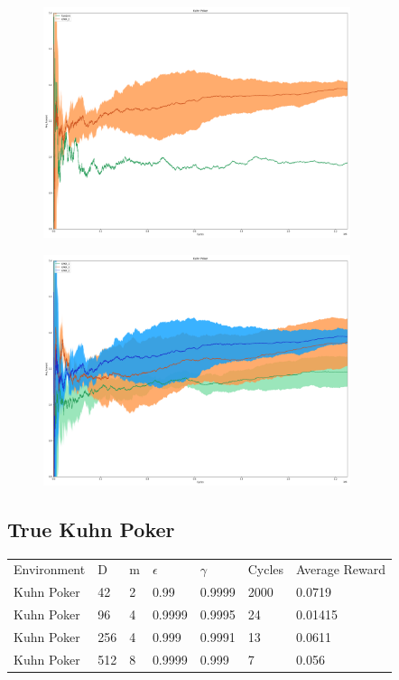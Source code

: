 \documentclass{article}
\theoremstyle{definition}
\newtheorem{primary statistics}[definition]{Primary Statistics}
\newtheorem{auxiliary statistics}[definition]{Auxiliary Statistics}
\begin{document}
 \begin{figure}[h]
 \centering
    \includegraphics[width=9cm]{RvU_Kuhn_Poker}
\end{figure}

 \begin{figure}[h]
 \centering
    \includegraphics[width=9cm]{BT_Kuhn_Poker_2}
\end{figure}

\newpage

\subsection{True Kuhn Poker}
\begin{tabular}{lllllll}
\centering
Environment & D & m & $\epsilon$ & $\gamma$ & Cycles & Average Reward \\
Kuhn Poker  & 42        & 2           & 0.99        & 0.9999            & 2000   & 0.0719        \\
Kuhn Poker  & 96        & 4           & 0.9999      & 0.9995            & 24     & 0.01415         \\
Kuhn Poker  & 256       & 4           & 0.999       & 0.9991            & 13     & 0.0611         \\
Kuhn Poker  & 512       & 8           & 0.9999      & 0.999             & 7      & 0.056              
\end{tabular}
\end{document}
